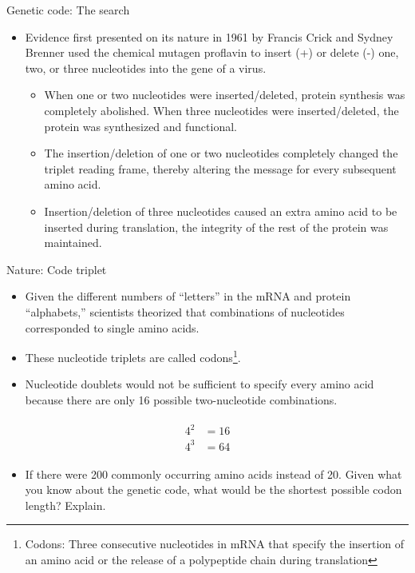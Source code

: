 \documentclass[11pt,dvipsnames,ignorenonframetext,aspectratio=169]{beamer}
\providecommand{\tightlist}{%
  \setlength{\itemsep}{0pt}\setlength{\parskip}{0pt}}
\begin{document}
\begin{frame}{Genetic code: The search}
\protect\hypertarget{genetic-code-the-search}{}
\begin{itemize}
\tightlist
\item
  Evidence first presented on its nature in 1961 by Francis Crick and
  Sydney Brenner used the chemical mutagen proflavin to insert (+) or
  delete (-) one, two, or three nucleotides into the gene of a virus.

  \begin{itemize}
  \tightlist
  \item
    When one or two nucleotides were inserted/deleted, protein synthesis
    was completely abolished. When three nucleotides were
    inserted/deleted, the protein was synthesized and functional.
  \item
    The insertion/deletion of one or two nucleotides completely changed
    the triplet reading frame, thereby altering the message for every
    subsequent amino acid.
  \item
    Insertion/deletion of three nucleotides caused an extra amino acid
    to be inserted during translation, the integrity of the rest of the
    protein was maintained.
  \end{itemize}
\end{itemize}
\end{frame}

\begin{frame}{Nature: Code triplet}
\protect\hypertarget{nature-code-triplet}{}
\begin{itemize}
\tightlist
\item
  Given the different numbers of ``letters'' in the mRNA and protein
  ``alphabets,'' scientists theorized that combinations of nucleotides
  corresponded to single amino acids.
\item
  These nucleotide triplets are called
  codons\footnote[frame]{Codons: Three consecutive nucleotides in mRNA that specify the insertion of an amino acid or the release of a polypeptide chain during translation}.
\item
  Nucleotide doublets would not be sufficient to specify every amino
  acid because there are only 16 possible two-nucleotide combinations.
\end{itemize}

\begin{align}
\begin{split}
4^2 &= 16 \nonumber \\
4^3 &= 64
\end{split}
\end{align}

\begin{itemize}
\tightlist
\item
  If there were 200 commonly occurring amino acids instead of 20. Given
  what you know about the genetic code, what would be the shortest
  possible codon length? Explain.
\end{itemize}
\end{frame}
\end{document}
